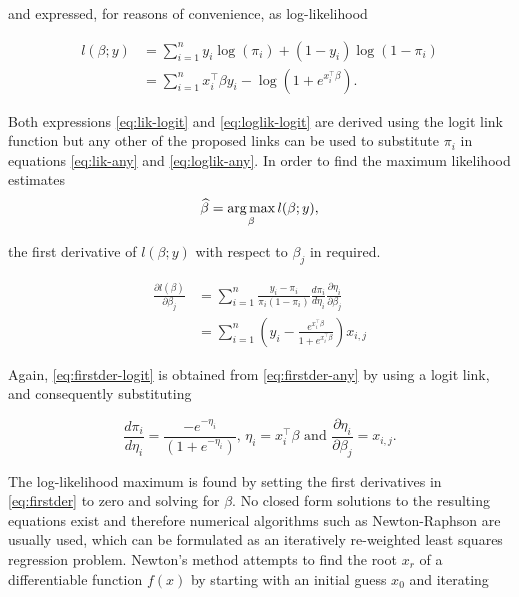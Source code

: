 and expressed, for reasons of convenience, as log-likelihood

\begin{subequations}
\begin{align}
  l(\beta; y) &= \sum_{i=1}^n y_i \log(\pi_i) + (1-y_i) \log(1-\pi_i) \label{eq:loglik-any} \\
  &= \sum_{i=1}^n x_i^\intercal \beta y_i -  \log\left(1+e^{x_i^\intercal \beta}\right). \label{eq:loglik-logit}
\end{align}
\end{subequations}

Both expressions \ref{eq:lik-logit} and \ref{eq:loglik-logit} are derived using the logit link function but any other of the proposed links can be used to substitute $\pi_i$ in equations \ref{eq:lik-any} and \ref{eq:loglik-any}. In order to find the maximum likelihood estimates
\begin{equation}
\widehat{\beta} = \operatorname*{arg\, max}_{\beta} l(\beta; y), 
\end{equation}

the first derivative of $l(\beta; y)$ with respect to $\beta_j$ in required.

\begin{subequations}\label{eq:firstder}
\begin{align}
  \frac{\partial l(\beta)}{\partial \beta_j} &= \sum_{i=1}^n \frac{y_i - \pi_i}{\pi_i (1-\pi_i)} \frac{d \pi_i}{d \eta_i} \frac{\partial \eta_i}{\partial \beta_j} \label{eq:firstder-any} \\
  &= \sum_{i=1}^n \left(y_i - \frac{e^{x_i^\intercal \beta}}{1+e^{x_i^\intercal \beta}}\right) x_{i,j} \label{eq:firstder-logit}
\end{align}
\end{subequations}

Again, \ref{eq:firstder-logit} is obtained from \ref{eq:firstder-any} by using a logit link, and consequently substituting 

\begin{equation*}
  \frac{d \pi_i}{d \eta_i} = \frac{-e^{-\eta_i}}{(1+e^{-\eta_i})} \text{,\ \ } \eta_i = x_i^\intercal \beta \text{\ \ and\ \ } \frac{\partial \eta_i}{\partial \beta_j} = x_{i,j}.
\end{equation*}

The log-likelihood maximum is found by setting the first derivatives in \ref{eq:firstder} to zero and solving for $\beta$. No closed form solutions to the resulting equations exist and therefore numerical algorithms such as Newton-Raphson are usually used, which can be formulated as an iteratively re-weighted least squares regression problem. Newton's method attempts to find the root $x_r$ of a differentiable function $f(x)$ by starting with an initial guess $x_0$ and iterating


